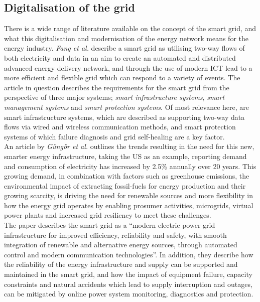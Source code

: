 \subsection{Digitalisation of the grid}
\label{sec:smart_grid}

There is a wide range of literature available on the concept of the smart grid, and what this digitalisation and modernisation of the energy network means for the energy industry.
\textit{Fang et al.} \cite{6099519} describe a smart grid as utilising two-way flows of both electricity and data in an aim to create an automated and distributed advanced energy delivery network, and through
the use of modern ICT lead to a more efficient and flexible grid which can respond to a variety of events. The article in question describes the requirements for the smart grid from
the perspective of three major systems; \textit{smart infrastructure systems}, \textit{smart management systems} and \textit{smart protection systems}. Of most relevance here, are
smart infrastructure systems, which are described as supporting two-way data flows via wired and wireless communication methods, and smart protection systems of which failure diagnosis and
grid self-healing are a key factor.
\\
An article by \textit{Güngör et al.} \cite{6011696} outlines the trends resulting in the need for this new, smarter energy infrastructure, taking the US as an example, reporting demand and consumption of electricity
has increased by 2.5\% annually over 20 years. This growing demand, in combination with factors such as greenhouse emissions, the environmental impact of extracting fossil-fuels for energy production and their
growing scarcity, is driving the need for renewable sources and more flexibility in how the energy grid operates by enabling prosumer activities, microgrids, virtual power plants
and increased grid resiliency to meet these challenges.
\\
The paper describes the smart grid as a ``modern electric power grid infrastructure for improved efficiency, reliability and safety,
with smooth integration of renewable and alternative energy sources, through automated control and modern communication technologies''. In addition, they describe how the reliability of the energy infrastructure
and supply can be supported and maintained in the smart grid, and how the impact of equipment failure, capacity constraints and natural accidents which lead to supply interruption and outages, can be
mitigated by online power system monitoring, diagnostics and protection.
